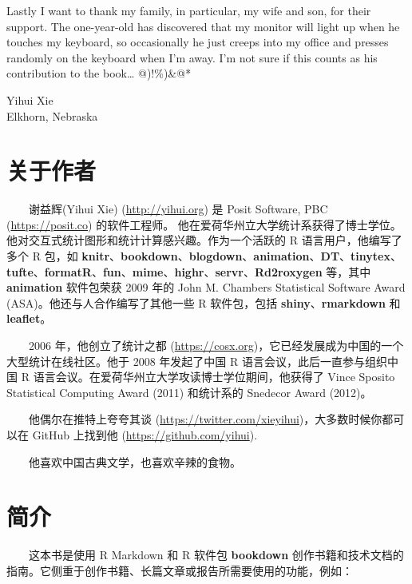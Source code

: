 \documentclass[
  12pt,
]{krantz}
\theoremstyle{definition}
\theoremstyle{definition}
\theoremstyle{definition}
\theoremstyle{definition}
\theoremstyle{remark}
\begin{document}
Lastly I want to thank my family, in particular, my wife and son, for their support. The one-year-old has discovered that my monitor will light up when he touches my keyboard, so occasionally he just creeps into my office and presses randomly on the keyboard when I'm away. I'm not sure if this counts as his contribution to the book\ldots{} @)!\%)\&@*

\begin{flushright}
Yihui Xie\\
Elkhorn, Nebraska
\end{flushright}

\hypertarget{ux5173ux4e8eux4f5cux8005}{%
\chapter*{关于作者}\label{ux5173ux4e8eux4f5cux8005}}


  谢益辉(Yihui Xie) (\url{http://yihui.org}) 是 Posit Software, PBC (\url{https://posit.co}) 的软件工程师。 他在爱荷华州立大学统计系获得了博士学位。他对交互式统计图形和统计计算感兴趣。作为一个活跃的 R 语言用户，他编写了多个 R 包，如 \textbf{knitr}、\textbf{bookdown}、\textbf{blogdown}、\textbf{animation}、\textbf{DT}、\textbf{tinytex}、\textbf{tufte}、\textbf{formatR}、\textbf{fun}、\textbf{mime}、\textbf{highr}、\textbf{servr}、\textbf{Rd2roxygen} 等，其中 \textbf{animation} 软件包荣获 2009 年的 John M. Chambers Statistical Software Award (ASA)。他还与人合作编写了其他一些 R 软件包，包括 \textbf{shiny}、\textbf{rmarkdown} 和 \textbf{leaflet}。

  2006 年，他创立了统计之都 (\url{https://cosx.org})，它已经发展成为中国的一个大型统计在线社区。他于 2008 年发起了中国 R 语言会议，此后一直参与组织中国 R 语言会议。在爱荷华州立大学攻读博士学位期间，他获得了 Vince Sposito Statistical Computing Award (2011) 和统计系的 Snedecor Award (2012)。

  他偶尔在推特上夸夸其谈 (\url{https://twitter.com/xieyihui})，大多数时候你都可以在 GitHub 上找到他 (\url{https://github.com/yihui}).

  他喜欢中国古典文学，也喜欢辛辣的食物。

\mainmatter

\hypertarget{introduction}{%
\chapter{简介}\label{introduction}}

  这本书是使用 R Markdown \citep{R-rmarkdown} 和 R 软件包 \textbf{bookdown} \citep{R-bookdown} 创作书籍和技术文档的指南。它侧重于创作书籍、长篇文章或报告所需要使用的功能，例如：
\end{document}
